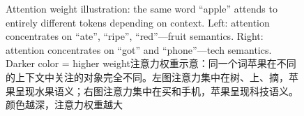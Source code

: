 \begin{figure}[ht]
\caption[\ifdefined\ENGLISH Attention weight illustration\else 注意力权重示意\fi]{\ifdefined\ENGLISH Attention weight illustration: the same word ``apple'' attends to entirely different tokens depending on context. Left: attention concentrates on ``ate'', ``ripe'', ``red''---fruit semantics. Right: attention concentrates on ``got'' and ``phone''---tech semantics. Darker color = higher weight\else 注意力权重示意：同一个词苹果在不同的上下文中关注的对象完全不同。左图注意力集中在树、上、摘，苹果呈现水果语义；右图注意力集中在买和手机，苹果呈现科技语义。颜色越深，注意力权重越大\fi}
\label{fig:attention-context}
\end{figure}
